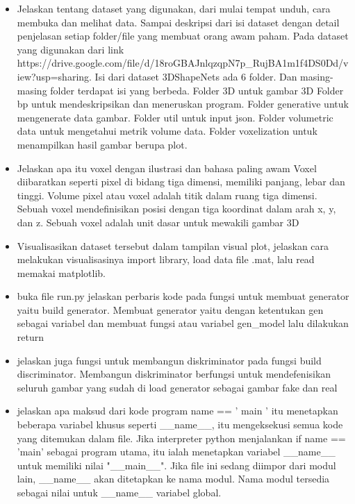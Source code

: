 \begin{enumerate}
\begin{itemize}
        	\item Jelaskan tentang dataset yang digunakan, dari mulai tempat unduh, cara membuka dan melihat data. Sampai deskripsi dari isi dataset dengan detail penjelasan setiap folder/ﬁle yang membuat orang awam paham.
Pada dataset yang digunakan dari link https://drive.google.com/file/d/18roGBAJnlqzqpN7p_RujBA1m1f4DS0Dd/view?usp=sharing.
Isi dari dataset 3DShapeNets ada 6 folder. Dan masing-masing folder terdapat isi yang berbeda.
Folder 3D untuk gambar 3D
Folder bp untuk mendeskripsikan dan meneruskan program.
Folder generative untuk mengenerate data gambar.
Folder util untuk input json.
Folder volumetric data untuk mengetahui metrik volume data.
Folder voxelization untuk menampilkan hasil gambar berupa plot.

        	\item Jelaskan apa itu voxel dengan ilustrasi dan bahasa paling awam
Voxel diibaratkan seperti pixel di bidang tiga dimensi, memiliki panjang, lebar dan tinggi. Volume pixel atau voxel adalah titik dalam ruang tiga dimensi. Sebuah voxel mendefinisikan posisi dengan tiga koordinat dalam arah x, y, dan z. Sebuah voxel adalah unit dasar untuk mewakili gambar 3D

        	\item Visualisasikan dataset tersebut dalam tampilan visual plot, jelaskan cara melakukan visualisasinya
import library, load data file .mat, lalu read memakai matplotlib.

        	\item buka ﬁle run.py jelaskan perbaris kode pada fungsi untuk membuat generator yaitu build generator.
Membuat generator yaitu dengan ketentukan gen sebagai variabel dan membuat fungsi atau variabel gen_model lalu dilakukan return

        	\item jelaskan juga fungsi untuk membangun diskriminator pada fungsi build discriminator.
Membangun diskriminator berfungsi untuk mendefenisikan seluruh gambar yang sudah di load generator sebagai gambar fake dan real

        	\item  jelaskan apa maksud dari kode program name == ’ main ’
itu menetapkan beberapa variabel khusus seperti __name__,
itu mengeksekusi semua kode yang ditemukan dalam file.
Jika interpreter python menjalankan if name == ’main’  sebagai program utama, itu ialah menetapkan variabel __name__  untuk memiliki nilai "__main__". Jika file ini sedang diimpor dari modul lain, __name__ akan ditetapkan ke nama modul. Nama modul tersedia sebagai nilai untuk __name__ variabel global.


\end{itemize}
\end{enumerate}
